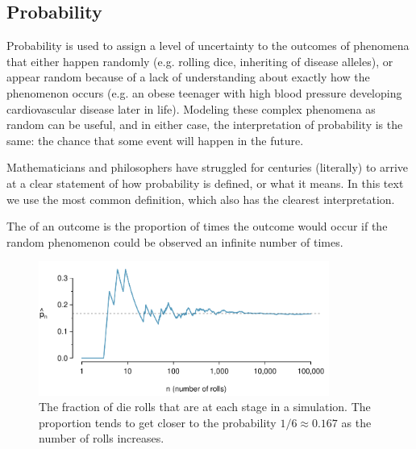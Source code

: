 \begin{doublespace}
\begin{exercise}
\end{exercise}

\subsection{Probability}


Probability is used to assign a level of uncertainty to the outcomes of phenomena that either happen randomly (e.g. rolling dice, inheriting of disease alleles), or appear random because of a lack of understanding about exactly how the phenomenon occurs (e.g. an obese teenager with high blood pressure developing cardiovascular disease later in life). Modeling these complex phenomena as random can be useful, and in either case, the interpretation of probability is the same: the chance that some event will happen in the future.

Mathematicians and philosophers have struggled for centuries (literally) to arrive at a clear statement of how probability is defined, or what it means.  In this text we use the most common definition, which also has the clearest interpretation.

\begin{termBox}{
The  of an outcome is the proportion of times the outcome would occur if the random phenomenon could be observed an infinite number of times.}
\end{termBox}


\begin{figure}[bt]
	\centering
	\includegraphics[width=0.85\textwidth]{ch_probability_oi_biostat/figures/dieProp/dieProp}
	\caption{The fraction of die rolls that are  at each stage in a simulation. The proportion tends to get closer to the probability $1/6 \approx 0.167$ as the number of rolls increases.}
	\label{fig:dieProp}
\end{figure}


\end{doublespace}
